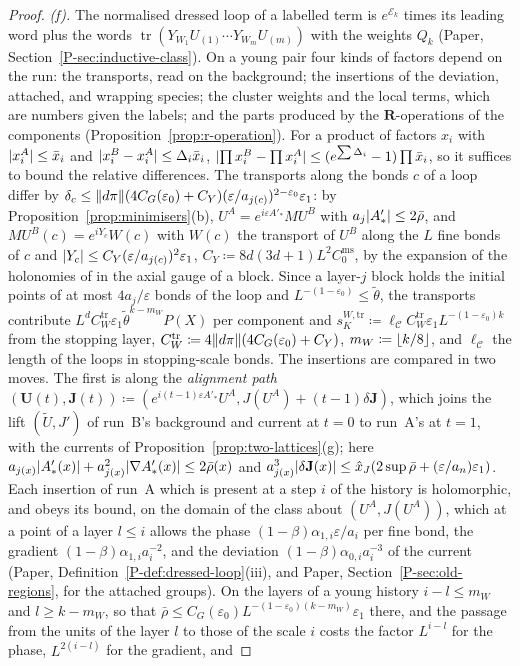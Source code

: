 \documentclass[11pt]{preprint}
\newcommand{\tr}{\operatorname{tr}}
\DeclarePairedDelimiter{\abs}{\lvert}{\rvert}
\DeclarePairedDelimiter{\norm}{\lVert}{\rVert}
\DeclarePairedDelimiter{\floor}{\lfloor}{\rfloor}
\numberwithin{equation}{section}
\theoremstyle{definition}
\theoremstyle{remark}
\theoremstyle{plain}
\begin{document}
\begin{proof}
\emph{(f).} The normalised dressed loop of a labelled term is $e^{\mathcal E_k}$ times its leading word plus the words $\tr(Y_{W_1}U_{(1)} \cdots Y_{W_m}U_{(m)})$ with the weights $Q_k$ (Paper, Section~\ref{P-sec:inductive-class}). On a young pair four kinds of factors depend on the run: the transports, read on the background; the insertions of the deviation, attached, and wrapping species; the cluster weights and the local terms, which are numbers given the labels; and the parts produced by the $\mathbf R$-operations of the components (Proposition~\ref{prop:r-operation}). For a product of factors $x_i$ with $\abs{x^A_i} \leq \bar x_i$ and $\abs{x^B_i - x^A_i} \leq \Delta_i\bar x_i$, $\abs{\prod x^B_i - \prod x^A_i} \leq (e^{\sum\Delta_i} - 1)\prod\bar x_i$, so it suffices to bound the relative differences. The transports along the bonds $c$ of a loop differ by $\delta_c \leq \norm{d\pi}(4C_G(\varepsilon_0) + C_Y)(\varepsilon/a_{j(c)})^{2-\varepsilon_0}\varepsilon_1$: by Proposition~\ref{prop:minimisers}(b), $U^A = e^{i\varepsilon A'_*}MU^B$ with $a_j\abs{A'_*} \leq 2\bar\rho$, and $MU^B(c) = e^{iY_c}W(c)$ with $W(c)$ the transport of $U^B$ along the $L$ fine bonds of $c$ and $\abs{Y_c} \leq C_Y(\varepsilon/a_{j(c)})^2\varepsilon_1$, $C_Y \coloneqq 8d(3d + 1)L^2C^{\mathrm{ms}}_0$, by the expansion of the holonomies of \cite[(0.4)]{BalabanRG1} in the axial gauge of a block. Since a layer-$j$ block holds the initial points of at most $4a_j/\varepsilon$ bonds of the loop and $L^{-(1-\varepsilon_0)} \leq \tilde\theta$, the transports contribute $L^dC^{\mathrm{tr}}_W\varepsilon_1\tilde\theta^{k-m_W}P(X)$ per component and $s^{W,\mathrm{tr}}_K \coloneqq \ell_{\mathcal C}C^{\mathrm{tr}}_W\varepsilon_1L^{-(1-\varepsilon_0)k}$ from the stopping layer, $C^{\mathrm{tr}}_W \coloneqq 4\norm{d\pi}(4C_G(\varepsilon_0) + C_Y)$, $m_W \coloneqq \floor{k/8}$, and $\ell_{\mathcal C}$ the length of the loops in stopping-scale bonds. The insertions are compared in two moves. The first is along the \emph{alignment path} $(\mathbf U(t), \mathbf J(t)) \coloneqq (e^{i(t-1)\varepsilon A'_*}U^A, J(U^A) + (t - 1)\delta\mathbf J)$, which joins the lift $(\tilde U, J')$ of run~B's background and current at $t = 0$ to run~A's at $t = 1$, with the currents of Proposition~\ref{prop:two-lattices}(g); here $a_{j(x)}\abs{A'_*(x)} + a_{j(x)}^2\abs{\nabla A'_*(x)} \leq 2\bar\rho(x)$ and $a_{j(x)}^3\abs{\delta\mathbf J(x)} \leq \hat x_J(2\sup\bar\rho + (\varepsilon/a_n)\varepsilon_1)$. Each insertion of run~A which is present at a step $i$ of the history is holomorphic, and obeys its bound, on the domain of the class about $(U^A, J(U^A))$, which at a point of a layer $l \leq i$ allows the phase $(1 - \beta)\alpha_{1,i}\varepsilon/a_i$ per fine bond, the gradient $(1 - \beta)\alpha_{1,i}a_i^{-2}$, and the deviation $(1 - \beta)\alpha_{0,i}a_i^{-3}$ of the current (Paper, Definition~\ref{P-def:dressed-loop}(iii), and Paper, Section~\ref{P-sec:old-regions}, for the attached groups). On the layers of a young history $i - l \leq m_W$ and $l \geq k - m_W$, so that $\bar\rho \leq C_G(\varepsilon_0)L^{-(1-\varepsilon_0)(k-m_W)}\varepsilon_1$ there, and the passage from the units of the layer $l$ to those of the scale $i$ costs the factor $L^{i-l}$ for the phase, $L^{2(i-l)}$ for the gradient, and 
\end{proof}
\end{document}
